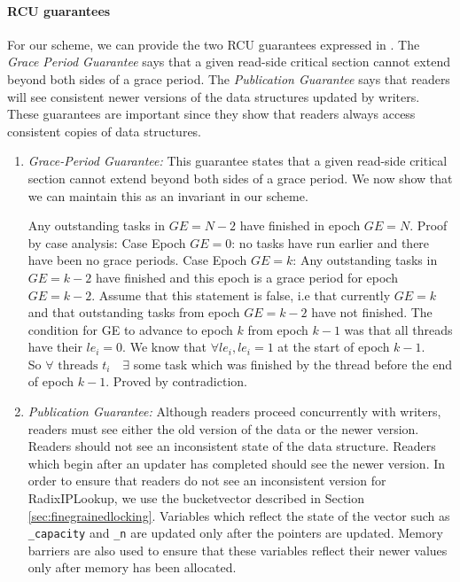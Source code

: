 \documentclass[a4paper,marginparwidth=50pt,marginparsep=10pt]{article}
\begin{document}
\paragraph{RCU guarantees} 
For our scheme, we can provide the two RCU guarantees expressed in \cite{urcu}. The \emph{Grace Period Guarantee} says that a given read-side critical section cannot extend beyond both sides of a grace period. The \emph{Publication Guarantee} says that readers will see consistent newer versions of the data structures updated by writers. These guarantees are important since they show that readers always access consistent copies of data structures. 
\begin{enumerate}
\item \emph{Grace-Period Guarantee:} This guarantee states that a given read-side critical section cannot extend beyond both sides of a grace period. We now show that we can maintain this as an invariant in our scheme.

\begin{algorithmic}
\STATE Any outstanding tasks in $GE=N-2$ have finished in epoch $GE=N$.
\STATE Proof by case analysis:
\STATE Case Epoch $GE=0$: no tasks have run earlier and there have been no grace periods.
\STATE Case Epoch $GE=k$: Any outstanding tasks in $GE=k-2$ have finished and this epoch is a grace period for epoch $GE=k-2$. 
\STATE Assume that this statement is false, i.e that currently $GE=k$ and that outstanding tasks from epoch $GE=k-2$ have not finished. The condition for GE to advance to epoch $k$ from epoch $k-1$ was that all threads have their  $le_i=0$. We know that $\forall le_i, le_i=1$ at the start of epoch $k-1$. \\So $\forall \mbox{ threads }t_i\mbox{ }$ $\exists$ some task which was finished by the thread before the end of epoch $k-1$. Proved by contradiction.  
\end{algorithmic}

\item \emph{Publication Guarantee:} 
Although readers proceed concurrently with writers, readers must see either the old version of the data or the newer version. Readers should not see an inconsistent state of the data structure. Readers which begin after an updater has completed should see the newer version. In order to ensure that readers do not see an inconsistent version for RadixIPLookup, we use the bucketvector described in Section \ref{sec:finegrainedlocking}. Variables which reflect the state of the vector such as \verb+_capacity+ and \verb+_n+ are updated only after the pointers are updated. Memory barriers are also used to ensure that these variables reflect their newer values only after memory has been allocated.\\
\end{enumerate}
\end{document}
